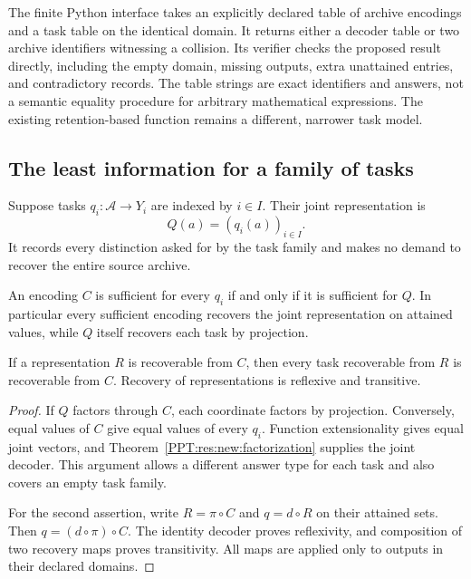 The finite Python interface  takes an explicitly declared table of archive encodings and a task table on the identical domain. It returns either a decoder table or two archive identifiers witnessing a collision. Its verifier checks the proposed result directly, including the empty domain, missing outputs, extra unattained entries, and contradictory records. The table strings are exact identifiers and answers, not a semantic equality procedure for arbitrary mathematical expressions. The existing retention-based  function remains a different, narrower task model.

\subsection{The least information for a family of tasks}
\label{PPT:sec:joint-recovery}

Suppose tasks $q_i:\mathscr A\to Y_i$ are indexed by $i\in I$. Their joint representation is
\[
 Q(a)=(q_i(a))_{i\in I}.
\]
It records every distinction asked for by the task family and makes no demand to recover the entire source archive.

\begin{PPTtheorem}
\label{PPT:res:new:joint}
An encoding $C$ is sufficient for every $q_i$ if and only if it is sufficient for $Q$. In particular every sufficient encoding recovers the joint representation on attained values, while $Q$ itself recovers each task by projection.

If a representation $R$ is recoverable from $C$, then every task recoverable from $R$ is recoverable from $C$. Recovery of representations is reflexive and transitive.
\end{PPTtheorem}
\begin{proof}
If $Q$ factors through $C$, each coordinate factors by projection. Conversely, equal values of $C$ give equal values of every $q_i$. Function extensionality gives equal joint vectors, and Theorem~\ref{PPT:res:new:factorization} supplies the joint decoder. This argument allows a different answer type for each task and also covers an empty task family.

For the second assertion, write $R=\pi\circ C$ and $q=d\circ R$ on their attained sets. Then $q=(d\circ\pi)\circ C$. The identity decoder proves reflexivity, and composition of two recovery maps proves transitivity. All maps are applied only to outputs in their declared domains.
\end{proof}

